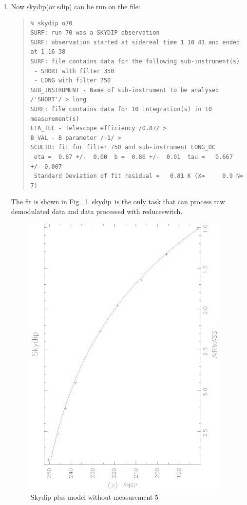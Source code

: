 \documentclass[twoside,11pt]{article}
\newcommand{\task}[1]{{\sf #1}}
\newcommand{\resw}{\htmlref{\task{reduce\_switch}}{REDUCE_SWITCH}}
\newcommand{\skydip}{\htmlref{\task{skydip}}{SKYDIP}}
\newcommand{\sdip}{\htmlref{\task{sdip}}{SDIP}}
\newenvironment{myquote}{\begin{quote}\begin{small}}{\end{small}\end{quote}}
\newcommand{\htmlref}[2]{#1}
\renewcommand{\_}{\texttt{\symbol{95}}}
\begin{document}
\begin{enumerate}
\item Now \skydip (or \sdip) can be run on the file:
\begin{myquote}
\begin{verbatim}
% skydip o70
SURF: run 70 was a SKYDIP observation
SURF: observation started at sidereal time 1 10 41 and ended at 1 16 38
SURF: file contains data for the following sub-instrument(s)
 - SHORT with filter 350
 - LONG with filter 750
SUB_INSTRUMENT - Name of sub-instrument to be analysed /'SHORT'/ > long
SURF: file contains data for 10 integration(s) in 10 measurement(s)
ETA_TEL - Telescope efficiency /0.87/ > 
B_VAL - B parameter /-1/ > 
SCULIB: fit for filter 750 and sub-instrument LONG_DC
 eta =  0.87 +/-  0.00  b =  0.86 +/-  0.01  tau =   0.667 +/- 0.007
 Standard Deviation of fit residual =   0.81 K (X=     0.9 N=    7)
\end{verbatim}
\end{myquote}
The fit is shown in Fig.\ \ref{fitsdip}. \skydip\ is the only task that can
process raw demodulated data and data processed with \resw.
\begin{figure}
\begin{center}
\includegraphics[width=4in,angle=-90]{sun216_fitsdip.eps}
\caption{Skydip plus model without measurement 5}
\label{fitsdip}
\end{center}
\end{figure}


\end{enumerate}
\end{document}
